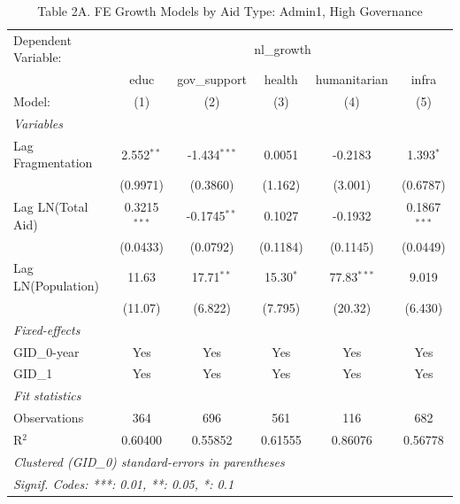 \begin{table}[H]
   \caption{Table 2A. FE Growth Models by Aid Type: Admin1, High Governance}
   \centering
   \begin{tabular}{lccccc}
      \tabularnewline \midrule \midrule
      Dependent Variable: & \multicolumn{5}{c}{nl\_growth}\\
                         & educ           & gov\_support   & health      & humanitarian  & infra \\   
      Model:             & (1)            & (2)            & (3)         & (4)           & (5)\\  
      \midrule
      \emph{Variables}\\
      Lag Fragmentation  & 2.552$^{**}$   & -1.434$^{***}$ & 0.0051      & -0.2183       & 1.393$^{*}$\\   
                         & (0.9971)       & (0.3860)       & (1.162)     & (3.001)       & (0.6787)\\   
      Lag LN(Total Aid)  & 0.3215$^{***}$ & -0.1745$^{**}$ & 0.1027      & -0.1932       & 0.1867$^{***}$\\   
                         & (0.0433)       & (0.0792)       & (0.1184)    & (0.1145)      & (0.0449)\\   
      Lag LN(Population) & 11.63          & 17.71$^{**}$   & 15.30$^{*}$ & 77.83$^{***}$ & 9.019\\   
                         & (11.07)        & (6.822)        & (7.795)     & (20.32)       & (6.430)\\   
      \midrule
      \emph{Fixed-effects}\\
      GID\_0-year        & Yes            & Yes            & Yes         & Yes           & Yes\\  
      GID\_1             & Yes            & Yes            & Yes         & Yes           & Yes\\  
      \midrule
      \emph{Fit statistics}\\
      Observations       & 364            & 696            & 561         & 116           & 682\\  
      R$^2$              & 0.60400        & 0.55852        & 0.61555     & 0.86076       & 0.56778\\  
      \midrule \midrule
      \multicolumn{6}{l}{\emph{Clustered (GID\_0) standard-errors in parentheses}}\\
      \multicolumn{6}{l}{\emph{Signif. Codes: ***: 0.01, **: 0.05, *: 0.1}}\\
   \end{tabular}
\end{table}



